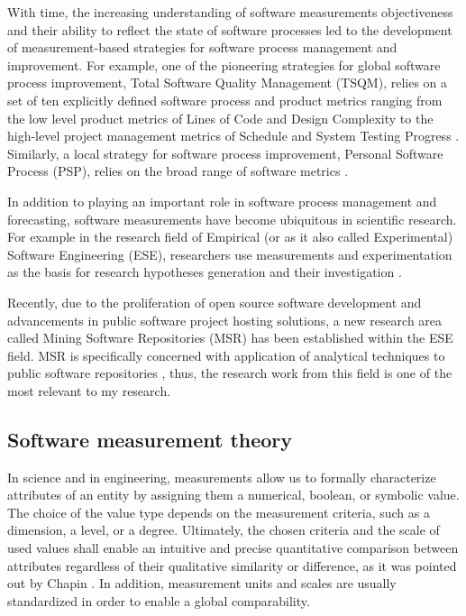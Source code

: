 With time, the increasing understanding of software measurements objectiveness and their ability to reflect 
the state of software processes led to the development of measurement-based strategies for software 
process management and improvement. 
For example, one of the pioneering strategies for global software process improvement, 
Total Software Quality Management (TSQM), relies on a set of ten explicitly defined software 
process and product metrics ranging from the low level product metrics of Lines of Code and Design Complexity to 
the high-level project management metrics of Schedule and System Testing Progress \cite{citeulike:13071448}.
Similarly, a local strategy for software process improvement, Personal Software Process (PSP), relies on 
the broad range of software metrics \cite{citeulike:13072239}.

In addition to playing an important role in software process management and forecasting, software 
measurements have become ubiquitous in scientific research. 
For example in the research field of Empirical (or as it also called Experimental) Software Engineering (ESE), 
researchers use measurements and experimentation as the basis for research hypotheses 
generation and their investigation \cite{citeulike:766768}. 

Recently, due to the proliferation of open source software development and advancements in public software
project hosting solutions, a new research area called Mining Software Repositories (MSR) has been established 
within the ESE field. MSR is specifically concerned with application of analytical techniques to public software 
repositories \cite{citeulike:12550438} \cite{citeulike:4534888} \cite{citeulike:2710928}, thus, 
the research work from this field is one of the most relevant to my research.

\subsection{Software measurement theory}
In science and in engineering, measurements allow us to formally characterize attributes of an entity by assigning 
them a numerical, boolean, or symbolic value. 
The choice of the value type depends on the measurement criteria, such as a dimension, a level, 
or a degree. Ultimately, the chosen criteria and the scale of used values shall enable an intuitive 
and precise quantitative comparison between attributes regardless of their qualitative similarity or 
difference, as it was pointed out by Chapin \cite{citeulike:13158806}. 
In addition, measurement units and scales are usually standardized in order to enable a global comparability.

